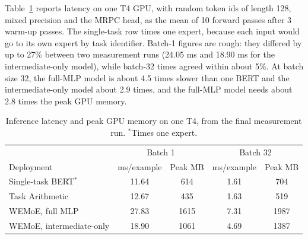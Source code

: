 Table~\ref{tab:latency} reports latency on one T4 GPU, with random token ids of length 128, mixed precision and the MRPC head, as the mean of 10 forward passes after 3 warm-up passes. The single-task row times one expert, because each input would go to its own expert by task identifier. Batch-1 figures are rough: they differed by up to 27\% between two measurement runs (24.05 ms and 18.90 ms for the intermediate-only model), while batch-32 times agreed within about 5\%. At batch size 32, the full-MLP model is about 4.5 times slower than one BERT and the intermediate-only model about 2.9 times, and the full-MLP model needs about 2.8 times the peak GPU memory.

\begin{table}[htbp]
  \centering\tablestyle
  \caption{Inference latency and peak GPU memory on one T4, from the final measurement run. $^{*}$Times one expert.}
  \label{tab:latency}
  \begin{tabular}{l c c c c}
    \toprule
    & \multicolumn{2}{c}{Batch 1} & \multicolumn{2}{c}{Batch 32}\\
    Deployment & ms/example & Peak MB & ms/example & Peak MB\\
    \midrule
    Single-task BERT$^{*}$ & 11.64 & 614 & 1.61 & 704\\
    Task Arithmetic & 12.67 & 435 & 1.63 & 519\\
    WEMoE, full MLP & 27.83 & 1615 & 7.31 & 1987\\
    WEMoE, intermediate-only & 18.90 & 1061 & 4.69 & 1387\\
    \bottomrule
  \end{tabular}
\end{table}
